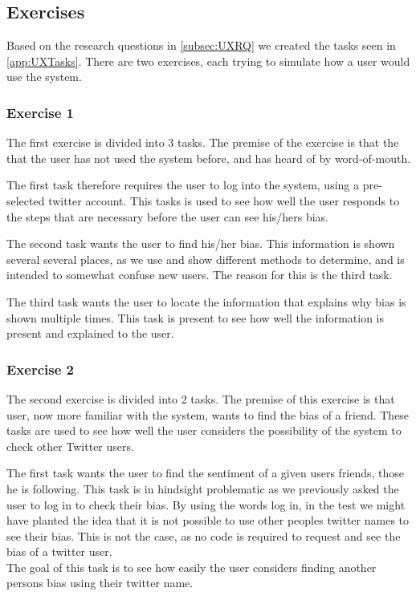 \subsection{Exercises}
Based on the research questions in \autoref{subsec:UXRQ} we created the tasks
seen in \autoref{app:UXTasks}. There are two exercises, each trying to simulate
how a user would use the system.\nl

\subsubsection{Exercise 1}\label{subsub:UXE1}
The first exercise is divided into 3 tasks. The premise of the exercise is that
the that the user has not used the system before, and has heard of by
word-of-mouth.\nl

The first task therefore requires the user to log into the system, using a
pre-selected twitter account. This tasks is used to see how well the user
responds to the steps that are necessary before the user can see his/hers
bias.\nl

The second task wants the user to find his/her bias. This information is shown
several several places, as we use and show different methods to determine, and
is intended to somewhat confuse new users. The reason for this is the third
task.\nl

The third task wants the user to locate the information that explains why bias
is shown multiple times. This task is present to see how well the information
is present and explained to the user.

\subsubsection{Exercise 2}
The second exercise is divided into 2 tasks. The premise of this exercise is
that user, now more familiar with the system, wants to find the bias of a
friend. These tasks are used to see how well the user considers the possibility
of the system to check other Twitter users.\nl

The first task wants the user to find the sentiment of a given users
friends, those he is following. This task is in hindsight problematic as we
previously asked the user to log in to check their bias. By using the words log
in, in the test we might have planted the idea that it is not possible to use other peoples twitter names to see their bias. This is not the
case, as no code is required to request and see the bias of a twitter user.\\
The goal of this task is to see how easily the user considers finding
another persons bias using their twitter name.\nl

